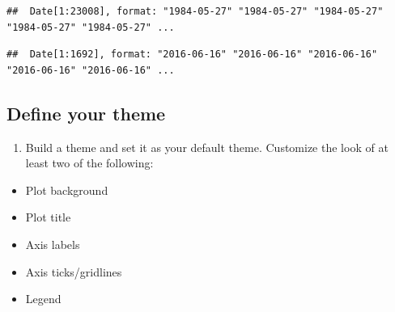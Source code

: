 \documentclass[
]{article}
\newenvironment{Shaded}{\begin{snugshade}}{\end{snugshade}}
\newcommand{\CommentTok}[1]{\textcolor[rgb]{0.56,0.35,0.01}{\textit{#1}}}
\newcommand{\FunctionTok}[1]{\textcolor[rgb]{0.13,0.29,0.53}{\textbf{#1}}}
\newcommand{\NormalTok}[1]{#1}
\newcommand{\OtherTok}[1]{\textcolor[rgb]{0.56,0.35,0.01}{#1}}
\newcommand{\SpecialCharTok}[1]{\textcolor[rgb]{0.81,0.36,0.00}{\textbf{#1}}}
\providecommand{\tightlist}{%
  \setlength{\itemsep}{0pt}\setlength{\parskip}{0pt}}
\begin{document}
\begin{Shaded}
\end{Shaded}

\begin{verbatim}
##  Date[1:23008], format: "1984-05-27" "1984-05-27" "1984-05-27" "1984-05-27" "1984-05-27" ...
\end{verbatim}

\begin{Shaded}
\end{Shaded}

\begin{verbatim}
##  Date[1:1692], format: "2016-06-16" "2016-06-16" "2016-06-16" "2016-06-16" "2016-06-16" ...
\end{verbatim}

\subsection{Define your theme}\label{define-your-theme}

\begin{enumerate}
\def\labelenumi{\arabic{enumi}.}
\setcounter{enumi}{2}
\tightlist
\item
  Build a theme and set it as your default theme. Customize the look of
  at least two of the following:
\end{enumerate}

\begin{itemize}
\tightlist
\item
  Plot background
\item
  Plot title
\item
  Axis labels
\item
  Axis ticks/gridlines
\item
  Legend
\end{itemize}
\end{document}

